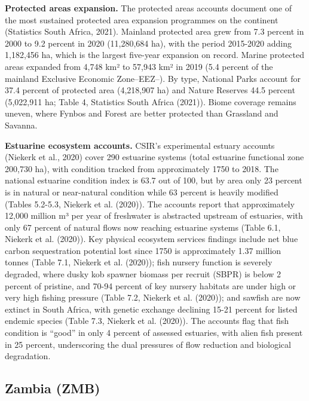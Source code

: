 \documentclass[
  letterpaper,
  DIV=11,
  numbers=noendperiod]{scrartcl}
\begin{document}
\textbf{Protected areas expansion.} The protected areas accounts
document one of the most sustained protected area expansion programmes
on the continent (Statistics South Africa, 2021). Mainland protected
area grew from 7.3 percent in 2000 to 9.2 percent in 2020 (11,280,684
ha), with the period 2015-2020 adding 1,182,456 ha, which is the largest
five-year expansion on record. Marine protected areas expanded from
4,748 km² to 57,943 km² in 2019 (5.4 percent of the mainland Exclusive
Economic Zone--EEZ--). By type, National Parks account for 37.4 percent
of protected area (4,218,907 ha) and Nature Reserves 44.5 percent
(5,022,911 ha; Table 4, Statistics South Africa (2021)). Biome coverage
remains uneven, where Fynbos and Forest are better protected than
Grassland and Savanna.

\textbf{Estuarine ecosystem accounts.} CSIR's experimental estuary
accounts ({Niekerk et al.}, 2020) cover 290 estuarine systems (total
estuarine functional zone 200,730 ha), with condition tracked from
approximately 1750 to 2018. The national estuarine condition index is
63.7 out of 100, but by area only 23 percent is in natural or
near-natural condition while 63 percent is heavily modified (Tables
5.2-5.3, {Niekerk et al.} (2020)). The accounts report that
approximately 12,000 million m³ per year of freshwater is abstracted
upstream of estuaries, with only 67 percent of natural flows now
reaching estuarine systems (Table 6.1, {Niekerk et al.} (2020)). Key
physical ecosystem services findings include net blue carbon
sequestration potential lost since 1750 is approximately 1.37 million
tonnes (Table 7.1, {Niekerk et al.} (2020)); fish nursery function is
severely degraded, where dusky kob spawner biomass per recruit (SBPR) is
below 2 percent of pristine, and 70-94 percent of key nursery habitats
are under high or very high fishing pressure (Table 7.2, {Niekerk et
al.} (2020)); and sawfish are now extinct in South Africa, with genetic
exchange declining 15-21 percent for listed endemic species (Table 7.3,
{Niekerk et al.} (2020)). The accounts flag that fish condition is
``good'' in only 4 percent of assessed estuaries, with alien fish
present in 25 percent, underscoring the dual pressures of flow reduction
and biological degradation.

\subsection{Zambia (ZMB)}\label{sec-annex-zmb}
\end{document}
